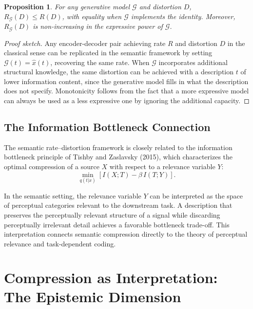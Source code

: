 \documentclass[11pt,a4paper]{article}
\newtheorem{proposition}[theorem]{Proposition}
\theoremstyle{definition}
\theoremstyle{remark}
\begin{document}
\begin{proposition}
For any generative model $\mathcal{G}$ and distortion $D$, $R_{\mathcal{G}}(D) \le R(D)$, with equality when $\mathcal{G}$ implements the identity. Moreover, $R_{\mathcal{G}}(D)$ is non-increasing in the expressive power of $\mathcal{G}$.
\end{proposition}

\begin{proof}[Proof sketch]
Any encoder-decoder pair achieving rate $R$ and distortion $D$ in the classical sense can be replicated in the semantic framework by setting $\mathcal{G}(t) = \hat{x}(t)$, recovering the same rate. When $\mathcal{G}$ incorporates additional structural knowledge, the same distortion can be achieved with a description $t$ of lower information content, since the generative model fills in what the description does not specify. Monotonicity follows from the fact that a more expressive model can always be used as a less expressive one by ignoring the additional capacity.
\end{proof}

\subsection{The Information Bottleneck Connection}

The semantic rate--distortion framework is closely related to the information bottleneck principle of Tishby and Zaslavsky (2015), which characterizes the optimal compression of a source $X$ with respect to a relevance variable $Y$:
\[
\min_{q(t|x)} \left[ I(X; T) - \beta \, I(T; Y) \right].
\]

In the semantic setting, the relevance variable $Y$ can be interpreted as the space of perceptual categories relevant to the downstream task. A description that preserves the perceptually relevant structure of a signal while discarding perceptually irrelevant detail achieves a favorable bottleneck trade-off. This interpretation connects semantic compression directly to the theory of perceptual relevance and task-dependent coding.

\section{Compression as Interpretation: The Epistemic Dimension}
\label{sec:interpretation}
\end{document}
